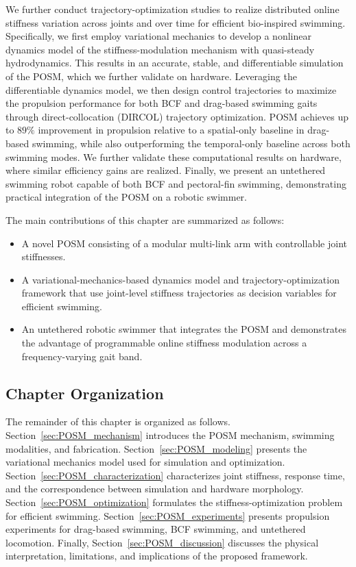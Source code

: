 We further conduct trajectory-optimization studies to realize distributed online stiffness variation across joints and over time for efficient bio-inspired swimming. Specifically, we first employ variational mechanics to develop a nonlinear dynamics model of the stiffness-modulation mechanism with quasi-steady hydrodynamics. This results in an accurate, stable, and differentiable simulation of the POSM, which we further validate on hardware. Leveraging the differentiable dynamics model, we then design control trajectories to maximize the propulsion performance for both BCF and drag-based swimming gaits through direct-collocation (DIRCOL) trajectory optimization. POSM achieves up to $89\%$ improvement in propulsion relative to a spatial-only baseline in drag-based swimming, while also outperforming the temporal-only baseline across both swimming modes. We further validate these computational results on hardware, where similar efficiency gains are realized. Finally, we present an untethered swimming robot capable of both BCF and pectoral-fin swimming, demonstrating practical integration of the POSM on a robotic swimmer.

The main contributions of this chapter are summarized as follows:
\begin{itemize}
    \item A novel POSM consisting of a modular multi-link arm with controllable joint stiffnesses.
    \item A variational-mechanics-based dynamics model and trajectory-optimization framework that use joint-level stiffness trajectories as decision variables for efficient swimming.
    \item An untethered robotic swimmer that integrates the POSM and demonstrates the advantage of programmable online stiffness modulation across a frequency-varying gait band.
\end{itemize}

\subsection{Chapter Organization}

The remainder of this chapter is organized as follows. Section~\ref{sec:POSM_mechanism} introduces the POSM mechanism, swimming modalities, and fabrication. Section~\ref{sec:POSM_modeling} presents the variational mechanics model used for simulation and optimization. Section~\ref{sec:POSM_characterization} characterizes joint stiffness, response time, and the correspondence between simulation and hardware morphology. Section~\ref{sec:POSM_optimization} formulates the stiffness-optimization problem for efficient swimming. Section~\ref{sec:POSM_experiments} presents propulsion experiments for drag-based swimming, BCF swimming, and untethered locomotion. Finally, Section~\ref{sec:POSM_discussion} discusses the physical interpretation, limitations, and implications of the proposed framework.

